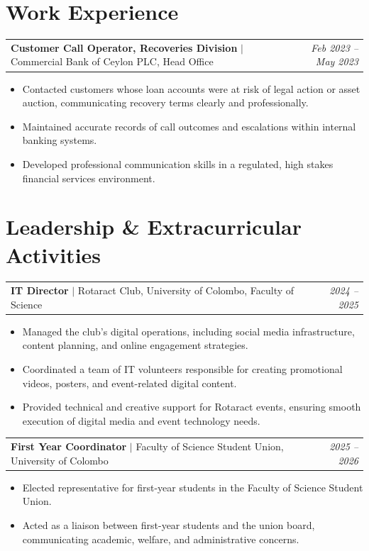 \documentclass[10pt, a4paper]{article}
\makeatletter
\newcommand{\cventry}[3]{%
  \begin{tabularx}{\linewidth}{@{}X r@{}}
    \textbf{#1} \textcolor{midgray}{$|$ #2} &
    \textit{\textcolor{midgray}{\small #3}}
  \end{tabularx}\vspace{1pt}%
}
\newenvironment{cvlist}{%
  \begin{itemize}[leftmargin=1.3em, itemsep=1pt, topsep=2pt, parsep=0pt]
}{%
  \end{itemize}%
}
\makeatother
\begin{document}
\section{Work Experience}

\cventry{Customer Call Operator, Recoveries Division}{Commercial Bank of Ceylon PLC, Head Office}{Feb 2023 -- May 2023}
\begin{cvlist}
  \item Contacted customers whose loan accounts were at risk of legal action or asset auction,
        communicating recovery terms clearly and professionally.
  \item Maintained accurate records of call outcomes and escalations within internal banking systems.
  \item Developed professional communication skills in a regulated, high stakes financial services environment.
\end{cvlist}

\section{Leadership \& Extracurricular Activities}

\cventry{IT Director}{Rotaract Club, University of Colombo, Faculty of Science}{2024 -- 2025}
\begin{cvlist}
  \item Managed the club's digital operations, including social media infrastructure, content planning, and online engagement strategies.
  \item Coordinated a team of IT volunteers responsible for creating promotional videos, posters, and event-related digital content.
  \item Provided technical and creative support for Rotaract events, ensuring smooth execution of digital media and event technology needs.
\end{cvlist}

\vspace{4pt}

\cventry{First Year Coordinator}{Faculty of Science Student Union, University of Colombo}{2025 -- 2026}
\begin{cvlist}
  \item Elected representative for first-year students in the Faculty of Science Student Union.
  \item Acted as a liaison between first-year students and the union board, communicating academic, welfare, and administrative concerns.
\end{cvlist}
\end{document}
